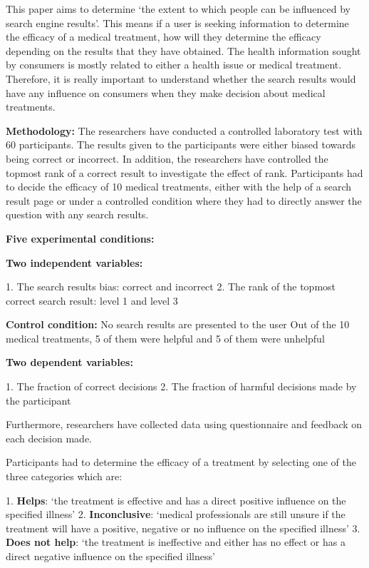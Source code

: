 \documentclass[]{article}
\begin{document}
This paper aims to determine ‘the extent to which people can be influenced by search engine results’. This means if a user is seeking information to determine the efficacy of a medical treatment, how will they determine the efficacy depending on the results that they have obtained. The health information sought by consumers is mostly related to either a health issue or medical treatment. Therefore, it is really important to understand whether the search results would have any influence on consumers when they make decision about medical treatments. 
     
\textbf{Methodology:} The researchers have conducted a controlled laboratory test with 60 participants. The results given to the participants were either biased towards being correct or incorrect. In addition, the researchers have controlled the topmost rank of a correct result to investigate the effect of rank. Participants had to decide the efficacy of 10 medical treatments, either with the help of a search result page or under a controlled condition where they had to directly answer the question with any search results. 

\textbf{Five experimental conditions:}

\textbf{Two independent variables:}

1.	The search results bias: correct and incorrect
2.	The rank of the topmost correct search result: level 1 and level 3

\textbf{Control condition: }No search results are presented to the user
Out of the 10 medical treatments, 5 of them were helpful and 5 of them were unhelpful

\textbf{Two dependent variables:}

1.	The fraction of correct decisions
2.	The fraction of harmful decisions made by the participant

Furthermore, researchers have collected data using questionnaire and feedback on each decision made. 

Participants had to determine the efficacy of a treatment by selecting one of the three categories which are:

1.\textbf{	Helps}: ‘the treatment is effective and has a direct positive influence on the specified illness’
2.	\textbf{Inconclusive}: ‘medical professionals are still unsure if the treatment will have a positive, negative or no influence on the specified illness’
3.	\textbf{Does not help}: ‘the treatment is ineffective and either has no effect or has a direct negative influence on the specified illness’
\end{document}
